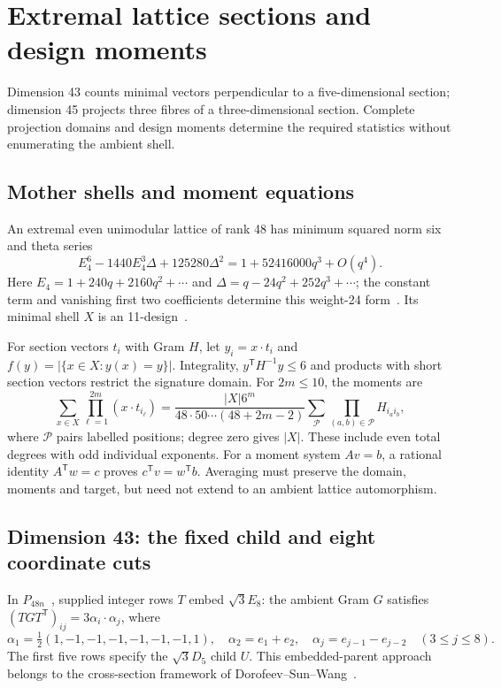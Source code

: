 \section{Extremal lattice sections and design moments}
\label{sec:sections}

Dimension 43 counts minimal vectors perpendicular to a five-dimensional
section; dimension 45 projects three fibres of a three-dimensional
section. Complete projection domains and design moments determine the
required statistics without enumerating the ambient shell.

\subsection{Mother shells and moment equations}
An extremal even unimodular lattice of rank 48 has minimum squared norm
six and theta series
\[
E_4^6-1440E_4^3\Delta+125280\Delta^2
=1+52416000q^3+O(q^4).
\]
Here $E_4=1+240q+2160q^2+\cdots$ and
$\Delta=q-24q^2+252q^3+\cdots$; the constant term and vanishing first
two coefficients determine this weight-24 form~\cite{conway1999sphere}.
Its minimal shell $X$ is an 11-design~\cite[Theorem 4.1]{nebe-designs}.

For section vectors $t_i$ with Gram $H$, let $y_i=x\cdot t_i$ and
$f(y)=|\{x\in X:y(x)=y\}|$. Integrality, $y^{\mathsf T}H^{-1}y\le6$
and products with short section vectors restrict the signature domain.
For $2m\le10$, the moments are
\begin{equation}\label{eq:section-moment}
\sum_{x\in X}\prod_{\ell=1}^{2m}(x\cdot t_{i_\ell})
=\frac{|X|6^m}{48\cdot50\cdots(48+2m-2)}
\sum_{\mathcal P}\prod_{(a,b)\in\mathcal P}H_{i_ai_b},
\end{equation}
where $\mathcal P$ pairs labelled positions; degree zero gives $|X|$.
These include even total degrees with odd individual exponents.
For a moment system $Av=b$, a rational identity $A^{\mathsf T}w=c$
proves $c^{\mathsf T}v=w^{\mathsf T}b$. Averaging must preserve the
domain, moments and target, but need not extend to an ambient
lattice automorphism.

\subsection{Dimension 43: the fixed child and eight coordinate cuts}
In $P_{48n}$~\cite{latticecatalogue}, supplied integer rows $T$ embed
$\sqrt3E_8$: the ambient Gram $G$ satisfies
$(TGT^{\mathsf T})_{ij}=3\alpha_i\cdot\alpha_j$, where
\[
\alpha_1=\tfrac12(1,-1,-1,-1,-1,-1,-1,1),\quad
\alpha_2=e_1+e_2,\quad
\alpha_j=e_{j-1}-e_{j-2}\quad(3\le j\le8).
\]
The first five rows specify the $\sqrt3D_5$ child $U$.
This embedded-parent approach belongs to the cross-section framework
of Dorofeev--Sun--Wang~\cite{dorofeev}.

